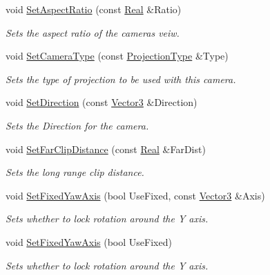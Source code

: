 \begin{DoxyCompactItemize}
void \hyperlink{classMezzanine_1_1Camera_ab619a29b83487e8f86c8adb443689078}{SetAspectRatio} (const \hyperlink{namespaceMezzanine_a726731b1a7df72bf3583e4a97282c6f6}{Real} \&Ratio)
\begin{DoxyCompactList}\small\item\em Sets the aspect ratio of the cameras veiw. \item\end{DoxyCompactList}\item 
void \hyperlink{classMezzanine_1_1Camera_a860c5efaa583795ff2f31e3670739e58}{SetCameraType} (const \hyperlink{classMezzanine_1_1Camera_a643bf90630796bca5353967664d5f6e3}{ProjectionType} \&Type)
\begin{DoxyCompactList}\small\item\em Sets the type of projection to be used with this camera. \item\end{DoxyCompactList}\item 
void \hyperlink{classMezzanine_1_1Camera_a3adfffaec91715cbf120bbbbc50f82db}{SetDirection} (const \hyperlink{classMezzanine_1_1Vector3}{Vector3} \&Direction)
\begin{DoxyCompactList}\small\item\em Sets the Direction for the camera. \item\end{DoxyCompactList}\item 
void \hyperlink{classMezzanine_1_1Camera_af24424a1670ae6b10e9a61fbaf9fd23a}{SetFarClipDistance} (const \hyperlink{namespaceMezzanine_a726731b1a7df72bf3583e4a97282c6f6}{Real} \&FarDist)
\begin{DoxyCompactList}\small\item\em Sets the long range clip distance. \item\end{DoxyCompactList}\item 
void \hyperlink{classMezzanine_1_1Camera_a2ffb9eca37630a8d26669aab8668bce3}{SetFixedYawAxis} (bool UseFixed, const \hyperlink{classMezzanine_1_1Vector3}{Vector3} \&Axis)
\begin{DoxyCompactList}\small\item\em Sets whether to lock rotation around the Y axis. \item\end{DoxyCompactList}\item 
void \hyperlink{classMezzanine_1_1Camera_abd19c7667593b8ea0bff576ae3a451ba}{SetFixedYawAxis} (bool UseFixed)
\begin{DoxyCompactList}\small\item\em Sets whether to lock rotation around the Y axis. \item\end{DoxyCompactList}\item 

\end{DoxyCompactItemize}
